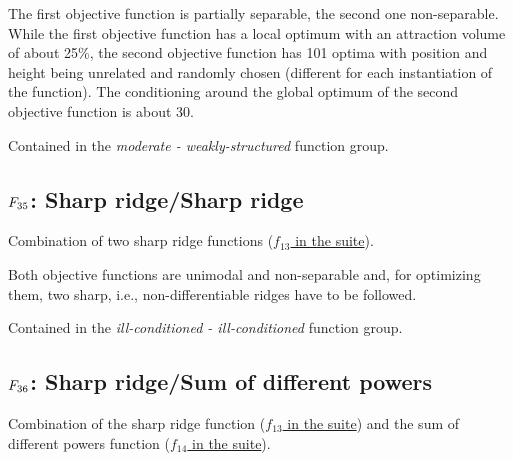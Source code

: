 The first objective function is partially separable, the second one
non-separable. While the first objective function has a local optimum
with an attraction volume of about 25\%, the second objective function
has 101 optima with position and height being unrelated and randomly
chosen (different for each instantiation of the function). The
conditioning around the global optimum of the second objective function
is about 30.

Contained in the \emph{moderate - weakly-structured} function group.



\subsection[\texorpdfstring{\protect\(F_{35}\protect\): Sharp ridge/Sharp ridge}{F35: Sharp ridge/Sharp ridge}]{\texorpdfstring{\protect\(F_{35}\protect\): Sharp ridge/Sharp ridge}{}}
\label{index:sharp-ridge-sharp-ridge}\label{index:f35}
Combination of two sharp ridge functions (\href{https://coco.gforge.inria.fr/downloads/download16.00/bbobdocfunctions.pdf\#page=65}{\(f_{13}\) in the \bbob suite}).

Both objective functions are unimodal and non-separable and, for
optimizing them, two sharp, i.e., non-differentiable ridges have to be
followed.

Contained in the \emph{ill-conditioned - ill-conditioned} function group.



\subsection[\texorpdfstring{\protect\(F_{36}\protect\): Sharp ridge/Sum of different powers}{F36: Sharp ridge/Sum of different powers}]{\texorpdfstring{\protect\(F_{36}\protect\): Sharp ridge/Sum of different powers}{}}
\label{index:sharp-ridge-sum-of-different-powers}\label{index:f36}
Combination of the sharp ridge function (\href{https://coco.gforge.inria.fr/downloads/download16.00/bbobdocfunctions.pdf\#page=65}{\(f_{13}\) in the \bbob suite}) and the
sum of different powers function
(\href{https://coco.gforge.inria.fr/downloads/download16.00/bbobdocfunctions.pdf\#page=70}{\(f_{14}\) in the \bbob suite}).

